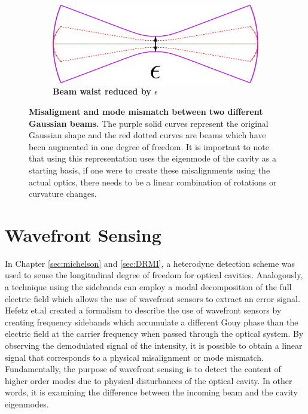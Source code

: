 \begin{figure}
\begin{subfigure}[b]{0.475\textwidth}
				\label{fig:BeamWaistDisplaced}
			\end{subfigure}
			\quad
			\begin{subfigure}[b]{0.475\textwidth}   
				\centering 
				\includegraphics[width=\textwidth]{../Figures/BeamWaistEnlarged.png}
				\caption[]{\textbf{Beam waist reduced by $\epsilon$}}    
				\label{fig:BeamWaistEnlarged}
			\end{subfigure}
			\caption[Misaligment and mode mismatch between two different Gaussian beams.]  
			{\textbf{Misaligment and mode mismatch between two different Gaussian beams.}
				The purple solid curves represent the original Gaussian shape and the red dotted curves are beams which have been augmented in one degree of freedom.  It is important to note that using this representation uses the eigenmode of the cavity as a starting basis, if one were to create these misalignments using the actual optics, there needs to be a linear combination of rotations or curvature changes.
			}
		\end{figure}
		
		\section{Wavefront Sensing}\label{WFS}
		In Chapter \ref{sec:michelson} and \ref{sec:DRMI}, a heterodyne detection scheme was used to sense the longitudinal degree of freedom for optical cavities.  Analogously, a technique using the sidebands can employ a modal decomposition of the full electric field which allows the use of wavefront sensors to extract an error signal.  Hefetz et.al \cite{HefetzWFS} created a formalism to describe the use of wavefront sensors by creating frequency sidebands which accumulate a different Gouy phase than the electric field at the carrier frequency when passed through the optical system.  By observing the demodulated signal of the intensity, it is possible to obtain a linear signal that corresponds to a physical misalignment or mode mismatch.  Fundamentally, the purpose of wavefront sensing is to detect the content of higher order modes due to physical disturbances of the optical cavity.  In other words, it is examining the difference between the incoming beam and the cavity eigenmodes.
		
